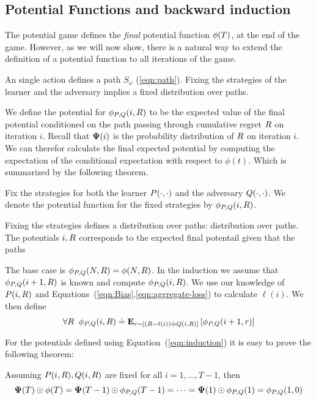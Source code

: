 \documentclass{article}[12pt]
\begin{document}
\subsection{Potential Functions and backward induction \label{sec:potentials}}

 The potential game defines the {\em final} potential
 function $\phi(T)$, at the end of the game. However, as we will now
 show, there is a natural way to extend the definition of a potential
 function to all iterations of the game.

 An single action defines a path $S_\omega$ (\ref{eqn:path}). Fixing
 the strategies of the learner and the adversary implies a fixed
 distribution over paths.

We define the potential for $\phi_{P,Q}(i,R)$ to be the expected value of
the final potential conditioned on the path passing through cumulative
regret $R$ on iteration $i$. Recall that ${\bf \Psi}(i)$ is the
probability distribution of $R$ on iteration $i$. We can therefor
calculate the final expected potential by computing the expectation of
the conditional expectation with respect to $\phi(t)$. Which is
summarized by the following theorem.

Fix the strategies for both the learner $P(\cdot,\cdot)$ and
the adversary $Q(\cdot,\cdot)$. We denote the potential
function for the fixed strategies by $\phi_{P,Q}(i,R)$.

Fixing the strategies defines a distribution over paths:
distribution over paths. The potentials $i,R$ corresponds to the
expected final potentail given that the paths 

The base case is  $\phi_{P,Q}(N,R) = \phi(N,R)$.
In the induction we assume that  $\phi_{P,Q}(i+1,R)$ is known and compute  $\phi_{P,Q}(i,R)$.
We use our knowledge of $P(i,R)$ and
Equations~(\ref{eqn:Bias},\ref{eqn:aggregate-loss}) to calculate
$\ell(i)$. We then define 
\begin{equation} \label{eqn:induction}
  \forall R\;\;
  \phi_{P,Q}(i,R) \doteq {\bf E}_{r \sim [(R-\ell(i)) \oplus Q(i,R)]}\left[ \phi_{P,Q}(i+1,r) \right]
\end{equation}

For the potentials defined using Equation~(\ref{eqn:induction}) it is
easy to prove the following theorem:

\begin{theorem} \label{thm:backward-recursion}
Assuming $ P(i,R), Q(i,R)$ are fixed for all
$i=1,\ldots,T-1$, then
\[
   {\bf \Psi}(T)\odot \phi(T)=
   {\bf \Psi}(T-1)\odot \phi_{P,Q}(T-1)= \cdots =
   {\bf \Psi}(1)\odot \phi_{P,Q}(1)=\phi_{P,Q}(1,0)
  \]
\end{theorem}
\end{document}

